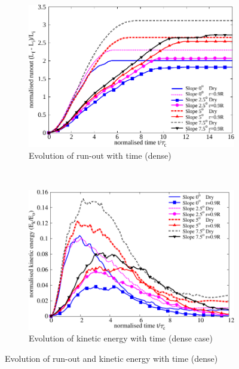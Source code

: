 \begin{figure}
\centering
\begin{subfigure}[t]{0.95\textwidth}
\centering
\includegraphics[width=0.95\columnwidth]{Runout_dense_slope}
\caption{Evolution of run-out with time (dense)}
\label{fig:run_dense}
\end{subfigure}\\
\begin{subfigure}[t]{0.95\textwidth}
\centering
\includegraphics[width=0.95\columnwidth]{KE_dense_slope}
\caption{Evolution of kinetic energy with time (dense case)}
\label{fig:KE_dense}
\end{subfigure}
\caption{Evolution of run-out and kinetic energy with time (dense)}
\label{fig:run_KE_dense}
\end{figure}

